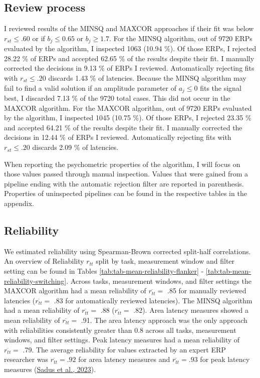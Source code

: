\documentclass[
  man]{apa7}
\begin{document}
\hypertarget{review-process}{%
\subsection{Review process}\label{review-process}}

I reviewed results of the MINSQ and MAXCOR approaches if their fit was below \(r_{st} \le .60\) or if \(b_j \le 0.65\) or \(b_j \ge 1.7\). For the MINSQ algorithm, out of 9720 ERPs evaluated by the algorithm, I inspected 1063 (10.94 \%). Of those ERPs, I rejected 28.22 \% of ERPs and accepted 62.65 \% of the results despite their fit. I manually corrected the decisions in 9.13 \% of ERPs I reviewed. Automatically rejecting fits with \(r_{st} \le .20\) discards 1.43 \% of latencies. Because the MINSQ algorithm may fail to find a valid solution if an amplitude parameter of \(a_j \le 0\) fits the signal best, I discarded 7.13 \% of the 9720 total cases. This did not occur in the MAXCOR algorithm.
For the MAXCOR algorithm, out of 9720 ERPs evaluated by the algorithm, I inspected 1045 (10.75 \%). Of those ERPs, I rejected 23.35 \% and accepted 64.21 \% of the results despite their fit. I manually corrected the decisions in 12.44 \% of ERPs I reviewed. Automatically rejecting fits with \(r_{st} \le .20\) discards 2.09 \% of latencies.

When reporting the psychometric properties of the algorithm, I will focus on those values passed through manual inspection. Values that were gained from a pipeline ending with the automatic rejection filter are reported in parenthesis. Properties of uninspected pipelines can be found in the respective tables in the appendix.

\hypertarget{reliability}{%
\subsection{Reliability}\label{reliability}}

We estimated reliability using Spearman-Brown corrected split-half correlations. An overview of Reliability \(r_{tt}\) split by task, measurement window and filter setting can be found in Tables \ref{tab:tab-mean-reliability-flanker} - \ref{tab:tab-mean-reliability-switching}. Across tasks, measurement windows, and filter settings the MAXCOR algorithm had a mean reliability of \(\overline{r_{tt}} =\) .85 for manually reviewed latencies (\(\overline{r_{tt}} =\) .83 for automatically reviewed latencies). The MINSQ algorithm had a mean reliability of \(\overline{r_{tt}} =\) .88 (\(\overline{r_{tt}} =\) .82). Area latency measures showed a mean reliability of \(\overline{r_{tt}} =\) .91. The area latency approach was the only approach with reliabilities consistently greater than \(0.8\) across all tasks, measurement windows, and filter settings. Peak latency measures had a mean reliability of \(\overline{r_{tt}} =\) .79. The average reliability for values extracted by an expert ERP researcher was \(\overline{r_{tt}} = .92\) for area latency measures and \(\overline{r_{tt}} = .93\) for peak latency measures (\protect\hyperlink{ref-sadus2023multiverse}{Sadus et al., 2023}).
\end{document}
